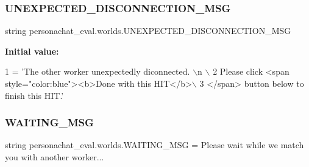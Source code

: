 \subsubsection{\texorpdfstring{U\+N\+E\+X\+P\+E\+C\+T\+E\+D\+\_\+\+D\+I\+S\+C\+O\+N\+N\+E\+C\+T\+I\+O\+N\+\_\+\+M\+SG}{UNEXPECTED\_DISCONNECTION\_MSG}}
{\footnotesize\ttfamily string personachat\+\_\+eval.\+worlds.\+U\+N\+E\+X\+P\+E\+C\+T\+E\+D\+\_\+\+D\+I\+S\+C\+O\+N\+N\+E\+C\+T\+I\+O\+N\+\_\+\+M\+SG}

{\bfseries Initial value\+:}
\begin{DoxyCode}
1 =  \textcolor{stringliteral}{'The other worker unexpectedly diconnected. \(\backslash\)n \(\backslash\)}
2 \textcolor{stringliteral}{        Please click <span style="color:blue"><b>Done with this HIT</b>\(\backslash\)}
3 \textcolor{stringliteral}{        </span> button below to finish this HIT.'}
\end{DoxyCode}
\mbox{\label{namespacepersonachat__eval_1_1worlds_aec42d3ce476692138479aa9ea2c953a1}} 
\subsubsection{\texorpdfstring{W\+A\+I\+T\+I\+N\+G\+\_\+\+M\+SG}{WAITING\_MSG}}
{\footnotesize\ttfamily string personachat\+\_\+eval.\+worlds.\+W\+A\+I\+T\+I\+N\+G\+\_\+\+M\+SG = \textquotesingle{}Please wait while we match you with another worker...\textquotesingle{}}

